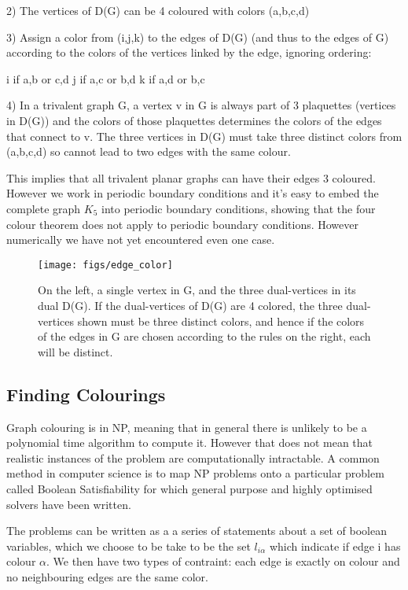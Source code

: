 2) The vertices of D(G) can be 4 coloured with colors (a,b,c,d)

3) Assign a color from (i,j,k) to the edges of D(G) (and thus to the edges of G) according to the colors of the vertices linked by the edge, ignoring ordering:

i if {a,b} or {c,d}
j if {a,c} or {b,d}
k if {a,d} or {b,c}

4) In a trivalent graph G, a vertex v in G is always part of 3 plaquettes (vertices in D(G)) and the colors of those plaquettes determines the colors of the edges that connect to v. The three vertices in D(G) must take three distinct colors from (a,b,c,d) so cannot lead to two edges with the same colour.

This implies that all trivalent planar graphs can have their edges 3 coloured. However we work in periodic boundary conditions and it's easy to embed the complete graph \(K_5\) into periodic boundary conditions, showing that the four colour theorem does not apply to periodic boundary conditions. However numerically we have not yet encountered even one case.

\begin{figure}
    \centering
    \texttt{[image: figs/edge\_color]}
    \caption{On the left, a single vertex in G, and the three dual-vertices in its dual D(G). If the dual-vertices of D(G) are 4 colored, the three dual-vertices shown must be three distinct colors, and hence if the colors of the edges in G are chosen according to the rules on the right, each will be distinct.}
    \label{fig:edge_color}
\end{figure}

\subsection{Finding Colourings}

Graph colouring is in NP, meaning that in general there is unlikely to be a polynomial time algorithm to compute it. However that does not mean that realistic instances of the problem are computationally intractable. A common method in computer science is to map NP problems onto a particular problem called Boolean Satisfiability for which general purpose and highly optimised solvers have been written.

The problems can be written as a a series of statements about a set of boolean variables, which we choose to be take to be the set \(l_{i\alpha}\) which indicate if edge i has colour \(\alpha\). We then have two types of contraint: each edge is exactly on colour and no neighbouring edges are the same color. 

